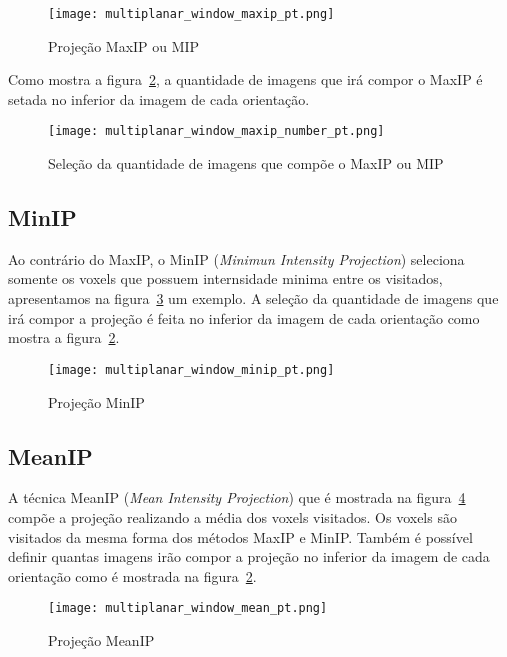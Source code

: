 \begin{figure}[H]
\centering
\texttt{[image: multiplanar\_window\_maxip\_pt.png]}
\caption{Projeção MaxIP ou MIP}
\label{fig:proj_maxip}
\end{figure}

Como mostra a figura~\ref{fig:proj_maxip_qtd}, a quantidade de imagens que irá compor o MaxIP é setada no inferior da imagem de cada orientação.

\begin{figure}[H]
\centering
\texttt{[image: multiplanar\_window\_maxip\_number\_pt.png]}
\caption{Seleção da quantidade de imagens que compõe o MaxIP ou MIP}
\label{fig:proj_maxip_qtd}
\end{figure}

\subsection{MinIP}

Ao contrário do MaxIP, o MinIP (\textit{Minimun Intensity Projection}) seleciona somente os voxels que possuem internsidade minima entre os visitados, apresentamos na figura~\ref{fig:proj_minIP} um exemplo. A seleção da quantidade de imagens que irá compor a projeção é feita no inferior da imagem de cada orientação como mostra a figura~\ref{fig:proj_maxip_qtd}.

\begin{figure}[H]
\centering
\texttt{[image: multiplanar\_window\_minip\_pt.png]}
\caption{Projeção MinIP}
\label{fig:proj_minIP}
\end{figure}

\subsection{MeanIP}
A técnica MeanIP (\textit{Mean Intensity Projection}) que é mostrada na figura~\ref{fig:proj_meanIP} compõe a projeção realizando a média dos voxels visitados. Os voxels são visitados da mesma forma dos métodos MaxIP e MinIP. Também é possível definir quantas imagens irão compor a projeção no inferior da imagem de cada orientação como é mostrada na figura~\ref{fig:proj_maxip_qtd}.

\begin{figure}[H]
\centering
\texttt{[image: multiplanar\_window\_mean\_pt.png]}
\caption{Projeção MeanIP}
\label{fig:proj_meanIP}
\end{figure}

